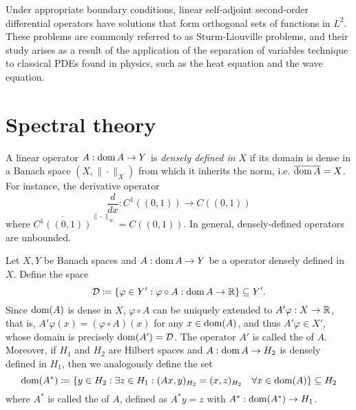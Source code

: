 Under appropriate boundary conditions, linear self-adjoint second-order differential operators have solutions that form orthogonal sets of functions in $L^2$. These problems are commonly referred to as Sturm-Liouville problems, and their study arises as a result of the application of the separation of variables technique to classical PDEs found in physics, such as the heat equation and the wave equation. 

\section{Spectral theory}\label{sec:spectral-theory}
\begin{definition}\label{def:densely-defined}
    A linear operator $A:\operatorname{\text{dom}} A \to Y$ is \emph{densely defined in $X$} if its domain is dense in a Banach space $(X,\|\cdot\|_X)$ from which it inherits the norm, i.e. $\overline{\operatorname{\text{dom}} A} = X$. For instance, the derivative operator 
    \begin{equation*}
        \frac{d}{dx}:C^1((0,1))\to C((0,1))
    \end{equation*}
    where $\overline{C^1((0,1))}^{\|\cdot\|_\infty} = C((0,1))$. In general, densely-defined operators are unbounded.
\end{definition}
\begin{definition}\label{def:transpose-adjoint}
    Let $X, Y$ be Banach spaces and $A:\operatorname{\text{dom}} A \to Y$ be a operator densely defined in $X$. Define the space
    \begin{equation}
        \mathcal{D}  \coloneqq  \{\varphi\in Y': \varphi\circ A:\operatorname{\text{dom}} A\to \mathbb{R} \}\subseteq Y'.
    \end{equation}
    Since $\operatorname{\text{dom}}(A)$ is dense in $X$, $\varphi\circ A$ can be uniquely extended to $A'\varphi:X\to \mathbb{R}$, that is, $A'\varphi(x) = (\varphi\circ A)(x)$ for any $x\in\operatorname{\text{dom}}(A)$, and thus $A'\varphi\in X'$, whose domain is precisely $\operatorname{\text{dom}}(A') = \mathcal{D}$. The operator $A'$ is called the  of $A$. Moreover, if $H_1$ and $H_2$ are Hilbert spaces and $A:\operatorname{\text{dom}} A\to H_2$ is densely defined in $H_1$, then we analogously define the set 
    \begin{equation}
        \operatorname{\text{dom}}(A^*)  \coloneqq  \{y\in H_2: \exists z\in H_1: (Ax,y)_{H_2} = (x,z)_{H_2}\quad \forall x\in\operatorname{\text{dom}}(A)\}\subseteq H_2
    \end{equation}
    where $A^*$ is called the  of $A$, defined as $A^*y = z$ with $A^*:\operatorname{\text{dom}}(A^*)\to H_1$.
\end{definition}
